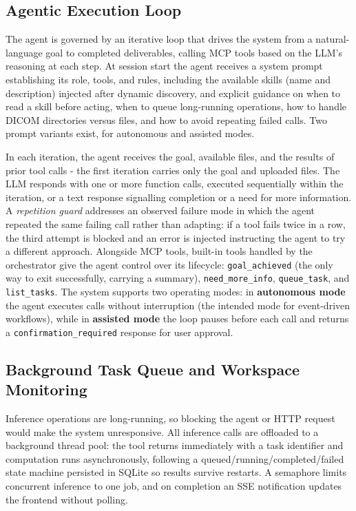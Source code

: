 \documentclass[conference]{IEEEtran}
\begin{document}
\subsection{Agentic Execution Loop}
The agent is governed by an iterative loop that drives the system from a natural-language goal to completed deliverables, calling MCP tools based on the LLM's reasoning at each step. At session start the agent receives a system prompt establishing its role, tools, and rules, including the available skills (name and description) injected after dynamic discovery, and explicit guidance on when to read a skill before acting, when to queue long-running operations, how to handle DICOM directories versus files, and how to avoid repeating failed calls. Two prompt variants exist, for autonomous and assisted modes.

In each iteration, the agent receives the goal, available files, and the results of prior tool calls - the first iteration carries only the goal and uploaded files. The LLM responds with one or more function calls, executed sequentially within the iteration, or a text response signalling completion or a need for more information. A \emph{repetition guard} addresses an observed failure mode in which the agent repeated the same failing call rather than adapting: if a tool fails twice in a row, the third attempt is blocked and an error is injected instructing the agent to try a different approach. Alongside MCP tools, built-in tools handled by the orchestrator give the agent control over its lifecycle: \texttt{goal\_achieved} (the only way to exit successfully, carrying a summary), \texttt{need\_more\_info}, \texttt{queue\_task}, and \texttt{list\_tasks}. The system supports two operating modes: in \textbf{autonomous mode} the agent executes calls without interruption (the intended mode for event-driven workflows), while in \textbf{assisted mode} the loop pauses before each call and returns a \texttt{confirmation\_required} response for user approval.

\subsection{Background Task Queue and Workspace Monitoring}
Inference operations are long-running, so blocking the agent or HTTP request would make the system unresponsive. All inference calls are offloaded to a background thread pool: the tool returns immediately with a task identifier and computation runs asynchronously, following a queued/running/completed/failed state machine persisted in SQLite so results survive restarts. A semaphore limits concurrent inference to one job, and on completion an SSE notification updates the frontend without polling.
\end{document}
